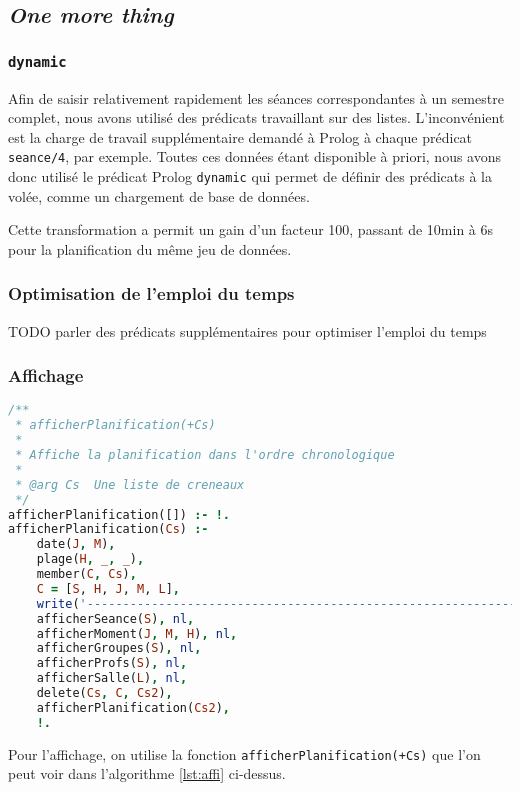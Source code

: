 
\subsection{\textit{One more thing}}

\subsubsection{\texttt{dynamic}}

Afin de saisir relativement rapidement les séances correspondantes à un semestre
complet, nous avons utilisé des prédicats travaillant sur des listes.
L'inconvénient est la charge de travail supplémentaire demandé à Prolog à chaque
prédicat \texttt{seance/4}, par exemple.
Toutes ces données étant disponible à priori, nous avons donc utilisé le
prédicat Prolog \texttt{dynamic} qui permet de définir des prédicats à la volée,
comme un chargement de base de données.

Cette transformation a permit un gain d'un facteur 100, passant de 10min à 6s
pour la planification du même jeu de données.

\subsubsection{Optimisation de l'emploi du temps}
TODO parler des prédicats supplémentaires pour optimiser l'emploi du temps

\subsubsection{Affichage}
\begin{lstlisting}[language=Prolog, caption=Affichage, captionpos=b,
label={lst:affi}]
/**
 * afficherPlanification(+Cs)
 *
 * Affiche la planification dans l'ordre chronologique
 *
 * @arg Cs  Une liste de creneaux
 */
afficherPlanification([]) :- !.
afficherPlanification(Cs) :-
    date(J, M),
    plage(H, _, _),
    member(C, Cs),
    C = [S, H, J, M, L],
    write('--------------------------------------------------------------'), nl,
    afficherSeance(S), nl,
    afficherMoment(J, M, H), nl,
    afficherGroupes(S), nl,
    afficherProfs(S), nl,
    afficherSalle(L), nl,
    delete(Cs, C, Cs2),
    afficherPlanification(Cs2),
    !.
\end{lstlisting}

Pour l'affichage, on utilise la fonction \texttt{afficherPlanification(+Cs)} que l'on peut voir dans l'algorithme \ref{lst:affi} ci-dessus.

